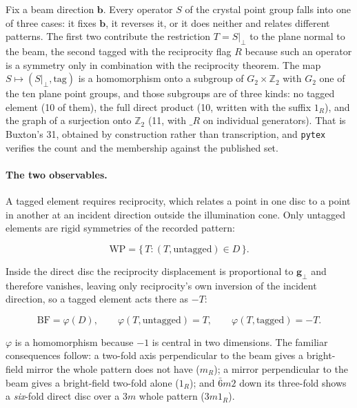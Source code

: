 Fix a beam direction \(\mathbf{b}\). Every operator \(S\) of the crystal point group falls into
one of three cases: it fixes \(\mathbf{b}\), it reverses it, or it does neither and relates
different patterns. The first two contribute the restriction \(T = S|_{\perp}\) to the plane
normal to the beam, the second tagged with the reciprocity flag \(R\) because such an operator
is a symmetry only in combination with the reciprocity theorem. The map \(S \mapsto (S|_\perp,
\text{tag})\) is a homomorphism onto a subgroup of \(G_2 \times \mathbb{Z}_2\) with \(G_2\) one
of the ten plane point groups, and those subgroups are of three kinds: no tagged element (10 of
them), the full direct product (10, written with the suffix \(1_R\)), and the graph of a
surjection onto \(\mathbb{Z}_2\) (11, with \(\_R\) on individual generators). That is Buxton's
31, obtained by construction rather than transcription, and \texttt{pytex} verifies the count
and the membership against the published set.

\paragraph{The two observables.} A tagged element requires reciprocity, which relates a point in
one disc to a point in another at an incident direction outside the illumination cone. Only
untagged elements are rigid symmetries of the recorded pattern:

\begin{equation}
  \text{WP} = \{\,T : (T, \text{untagged}) \in D\,\}.
\end{equation}

Inside the direct disc the reciprocity displacement is proportional to \(\mathbf{g}_\perp\) and
therefore vanishes, leaving only reciprocity's own inversion of the incident direction, so a
tagged element acts there as \(-T\):

\begin{equation}
  \text{BF} = \varphi(D),
  \qquad \varphi(T, \text{untagged}) = T,
  \qquad \varphi(T, \text{tagged}) = -T .
\end{equation}

\(\varphi\) is a homomorphism because \(-1\) is central in two dimensions. The familiar
consequences follow: a two-fold axis perpendicular to the beam gives a bright-field mirror the
whole pattern does not have (\(m_R\)); a mirror perpendicular to the beam gives a bright-field
two-fold alone (\(1_R\)); and \(\bar{6}m2\) down its three-fold shows a \emph{six}-fold direct
disc over a \(3m\) whole pattern (\(3m1_R\)).

